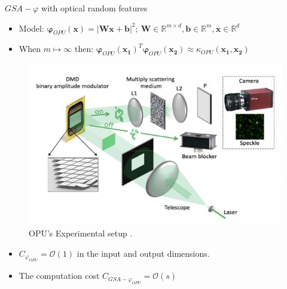 \documentclass{beamer}
\begin{document}
\begin{frame}{$GSA-\varphi$ with optical random features}
    \begin{itemize}
    \footnotesize
        \item Model: $\mathbf{\varphi}_{OPU}(\mathbf{x})=|\mathbf{Wx+b}|^2 ;~\mathbf{W}\in \mathbb{R}^{m\times d},\mathbf{b}\in \mathbb{R}^m, \mathbf{x}\in \mathbb{R}^d$
        \item When $m\mapsto\infty$ then: $\mathbf{\varphi}_{OPU}(\mathbf{x_1})^T\mathbf{\varphi}_{OPU}(\mathbf{x_2})\approx \kappa_{OPU}(\mathbf{x_1}, \mathbf{x_2})$
    \end{itemize}
    \begin{figure}[ht!]
\begin{center}
\includegraphics[scale=0.3]{figs/lighton630.jpg}
\end{center}
\caption*{OPU's Experimental setup \citep{saade2016random}.}
\label{fig_opu}
\end{figure}
\begin{itemize}
    \item $C_{\varphi_{OPU}}=\mathcal{O}(1)$ in the input and output dimensions.
    \vfill
          \item The computation cost  $C_{GSA-\varphi_{OPU}} =   \mathcal{O}(s)$

\end{itemize}
\end{frame}
\end{document}
